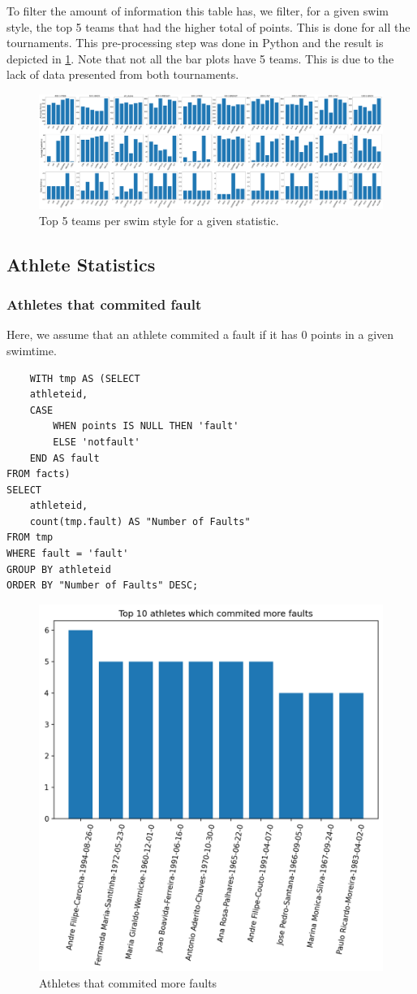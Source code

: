 \documentclass[a4paper, 11pt]{article}
\begin{document}
To filter the amount of information this table has, we filter, for a given swim style, the top 5 teams that had the higher total of points. This is done for all the
tournaments. This pre-processing step was done in Python and the result is depicted in \cref{fig:clubs_fact2}. Note that not all the bar plots have 5 teams. This
is due to the lack of data presented from both tournaments.

\begin{figure}[H]
    \centering
    \includegraphics[width=\textwidth]{img/stats_clubs_swim.pdf}
    \caption{Top 5 teams per swim style for a given statistic.}
    \label{fig:clubs_fact2}
\end{figure}

\subsection{Athlete Statistics}

\subsubsection{Athletes that commited fault}

Here, we assume that an athlete commited a fault if it has 0 points in a given swimtime.

\begin{verbatim}
    WITH tmp AS (SELECT 
	athleteid,
	CASE 
		WHEN points IS NULL THEN 'fault' 
		ELSE 'notfault' 
	END AS fault
FROM facts)
SELECT
	athleteid,
	count(tmp.fault) AS "Number of Faults"
FROM tmp
WHERE fault = 'fault'
GROUP BY athleteid
ORDER BY "Number of Faults" DESC;
\end{verbatim}

\begin{figure}[H]
    \centering
    \includegraphics[width=.55\textwidth]{img/faults.png}
    \caption{Athletes that commited more faults}
\end{figure}
\end{document}
